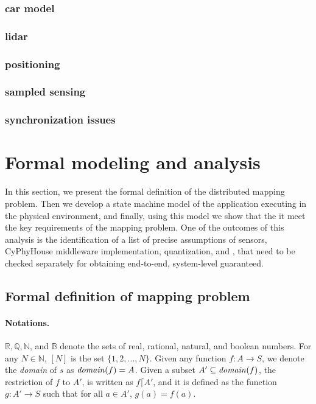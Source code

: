 \subsubsection{car model}
\subsubsection{lidar}
\subsubsection{positioning}
\subsubsection{sampled sensing}
\subsubsection{synchronization issues}

\section{Formal modeling and analysis}
\label{sec:formal}

In this section, we present the formal definition of the distributed mapping problem. Then we develop a state machine model of the \dmap application executing in the physical environment, and finally, using this model we show that the it meet the key requirements of the mapping problem. One of the outcomes of this analysis is the identification of a list of precise 
 assumptions of sensors, CyPhyHouse middleware implementation, quantization, and , that need to be checked separately for obtaining end-to-end, system-level guaranteed. 
 
\subsection{Formal definition of mapping problem}
\label{sec:prelims}

\paragraph{Notations.}
$\mathbb{R}, \mathbb{Q},\mathbb{N}$, and $\mathbb{B}$ denote the sets of real, rational, natural, and boolean numbers.
For any $N \in \mathbb{N}$, $[N]$ is the set $\{1,2,\ldots,N\}$.
%
Given any function $f:A \rightarrow S$, we denote the {\em domain\/} of $s$ as $\mathit{domain}(f) = A$.
%
Given a subset $A' \subseteq \mathit{domain}(f)$, 
    the restriction of $f$ to $A'$, is written as $f \lceil A'$, and it is defined as the function $g:A' \rightarrow S$ such that for all $a \in A'$, $g(a) = f(a)$.


